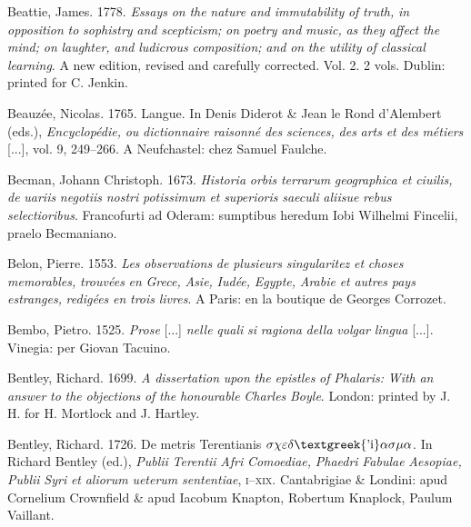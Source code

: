 Beattie, James. 1778. \textit{Essays} \textit{on} \textit{the} \textit{nature} \textit{and} \textit{immutability} \textit{of} \textit{truth,} \textit{in} \textit{opposition} \textit{to} \textit{sophistry} \textit{and} \textit{scepticism;} \textit{on} \textit{poetry} \textit{and} \textit{music,} \textit{as} \textit{they} \textit{affect} \textit{the} \textit{mind;} \textit{on} \textit{laughter,} \textit{and} \textit{ludicrous} \textit{composition;} \textit{and} \textit{on} \textit{the} \textit{utility} \textit{of} \textit{classical} \textit{learning}. A new edition, revised and carefully corrected. Vol. 2. 2 vols. Dublin: printed for C. Jenkin.

Beauzée, Nicolas. 1765. Langue. In Denis Diderot \& Jean le Rond d’Alembert (eds.), \textit{Encyclopédie,} \textit{ou} \textit{dictionnaire} \textit{raisonné} \textit{des} \textit{sciences,} \textit{des} \textit{arts} \textit{et} \textit{des} \textit{métiers} [...], vol. 9, 249–266. A Neufchastel: chez Samuel Faulche.

Becman, Johann Christoph. 1673. \textit{Historia} \textit{orbis} \textit{terrarum} \textit{geographica} \textit{et} \textit{ciuilis,} \textit{de} \textit{uariis} \textit{negotiis} \textit{nostri} \textit{potissimum} \textit{et} \textit{superioris} \textit{saeculi} \textit{aliisue} \textit{rebus} \textit{selectioribus}. Francofurti ad Oderam: sumptibus heredum Iobi Wilhelmi Fincelii, praelo Becmaniano.

Belon, Pierre. 1553. \textit{Les} \textit{observations} \textit{de} \textit{plusieurs} \textit{singularitez} \textit{et} \textit{choses} \textit{memorables,} \textit{trouvées} \textit{en} \textit{Grece,} \textit{Asie,} \textit{Iudée,} \textit{Egypte,} \textit{Arabie} \textit{et} \textit{autres} \textit{pays} \textit{estranges,} \textit{redigées} \textit{en} \textit{trois} \textit{livres}. A Paris: en la boutique de Georges Corrozet.

Bembo, Pietro. 1525. \textit{Prose} [...] \textit{nelle} \textit{quali} \textit{si} \textit{ragiona} \textit{della} \textit{volgar} \textit{lingua} [...]. Vinegia: per Giovan Tacuino.

Bentley, Richard. 1699. \textit{A} \textit{dissertation} \textit{upon} \textit{the} \textit{epistles} \textit{of} \textit{Phalaris:} \textit{With} \textit{an} \textit{answer} \textit{to} \textit{the} \textit{objections} \textit{of} \textit{the} \textit{honourable} \textit{Charles} \textit{Boyle}. London: printed by J. H. for H. Mortlock and J. Hartley.

Bentley, Richard. 1726. De metris Terentianis $\sigma \chi \varepsilon \delta \text{\textgreek{'i}}\alpha \sigma \mu \alpha $. In Richard Bentley (ed.), \textit{Publii} \textit{Terentii} \textit{Afri} \textit{Comoediae,} \textit{Phaedri} \textit{Fabulae} \textit{Aesopiae,} \textit{Publii} \textit{Syri} \textit{et} \textit{aliorum} \textit{ueterum} \textit{sententiae}, \textsc{i}–\textsc{xix}. Cantabrigiae \& Londini: apud Cornelium Crownfield \& apud Iacobum Knapton, Robertum Knaplock, Paulum Vaillant.

